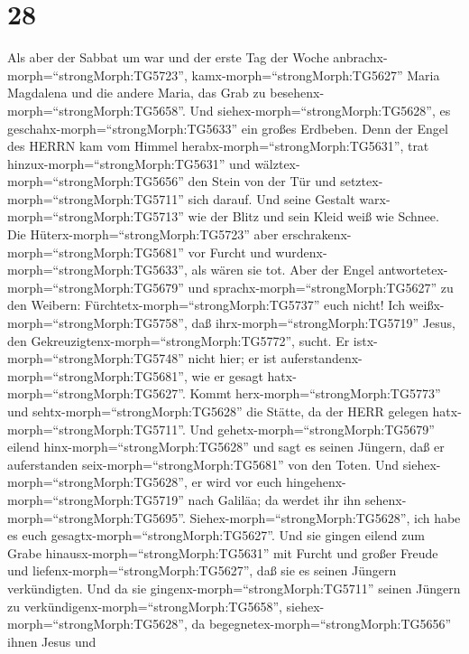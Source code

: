 \hypertarget{section-27}{%
\section{28}\label{section-27}}

 Als aber der Sabbat um war und der erste Tag der Woche
anbrachx-morph=``strongMorph:TG5723'', kamx-morph=``strongMorph:TG5627''
Maria Magdalena und die andere Maria, das Grab zu
besehenx-morph=``strongMorph:TG5658''.  Und
siehex-morph=``strongMorph:TG5628'', es
geschahx-morph=``strongMorph:TG5633'' ein großes Erdbeben. Denn der
Engel des HERRN kam vom Himmel herabx-morph=``strongMorph:TG5631'', trat
hinzux-morph=``strongMorph:TG5631'' und
wälztex-morph=``strongMorph:TG5656'' den Stein von der Tür und
setztex-morph=``strongMorph:TG5711'' sich darauf.  Und seine
Gestalt warx-morph=``strongMorph:TG5713'' wie der Blitz und sein Kleid
weiß wie Schnee.  Die Hüterx-morph=``strongMorph:TG5723''
aber erschrakenx-morph=``strongMorph:TG5681'' vor Furcht und
wurdenx-morph=``strongMorph:TG5633'', als wären sie tot. 
Aber der Engel antwortetex-morph=``strongMorph:TG5679'' und
sprachx-morph=``strongMorph:TG5627'' zu den Weibern:
Fürchtetx-morph=``strongMorph:TG5737'' euch nicht! Ich
weißx-morph=``strongMorph:TG5758'', daß
ihrx-morph=``strongMorph:TG5719'' Jesus, den
Gekreuzigtenx-morph=``strongMorph:TG5772'', sucht.  Er
istx-morph=``strongMorph:TG5748'' nicht hier; er ist
auferstandenx-morph=``strongMorph:TG5681'', wie er gesagt
hatx-morph=``strongMorph:TG5627''. Kommt
herx-morph=``strongMorph:TG5773'' und sehtx-morph=``strongMorph:TG5628''
die Stätte, da der HERR gelegen hatx-morph=``strongMorph:TG5711''.
 Und gehetx-morph=``strongMorph:TG5679'' eilend
hinx-morph=``strongMorph:TG5628'' und sagt es seinen Jüngern, daß er
auferstanden seix-morph=``strongMorph:TG5681'' von den Toten. Und
siehex-morph=``strongMorph:TG5628'', er wird vor euch
hingehenx-morph=``strongMorph:TG5719'' nach Galiläa; da werdet ihr ihn
sehenx-morph=``strongMorph:TG5695''.
Siehex-morph=``strongMorph:TG5628'', ich habe es euch
gesagtx-morph=``strongMorph:TG5627''.  Und sie gingen eilend
zum Grabe hinausx-morph=``strongMorph:TG5631'' mit Furcht und großer
Freude und liefenx-morph=``strongMorph:TG5627'', daß sie es seinen
Jüngern verkündigten. Und da sie gingenx-morph=``strongMorph:TG5711''
seinen Jüngern zu verkündigenx-morph=``strongMorph:TG5658'',
 siehex-morph=``strongMorph:TG5628'', da
begegnetex-morph=``strongMorph:TG5656'' ihnen Jesus und
